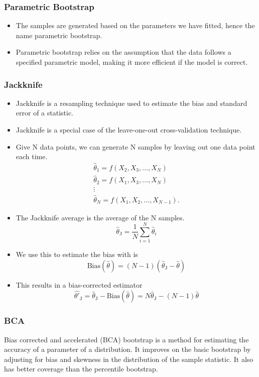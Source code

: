 \documentclass[12pt,a4paper]{article}
\begin{document}
\subsubsection{Parametric Bootstrap}
\begin{itemize}
    \item The samples are generated based on the parameters we have fitted, hence the name parametric bootstrap.
    \item Parametric bootstrap relies on the assumption that the data follows a specified parametric model, making it more efficient if the model is correct.
\end{itemize}
\subsubsection{Jackknife}
\begin{itemize}
    \item Jackknife is a resampling technique used to estimate the bias and standard error of a statistic.
    \item Jackknife is a special case of the leave-one-out cross-validation technique.
    \item Give N data points, we can generate N samples by leaving out one data point each time.
        \begin{equation*}
        \begin{array}{r}
        \hat{\theta}_1=f\left(X_2, X_3, \ldots, X_N\right) \\
        \hat{\theta}_2=f\left(X_1, X_3, \ldots, X_N\right) \\
        \vdots \\
        \hat{\theta}_N=f\left(X_1, X_2, \ldots, X_{N-1}\right) .
        \end{array}
        \end{equation*}
    \item The Jackknife average is the average of the N samples.
    $$
    \hat{\theta}_{\mathrm{J}}=\frac{1}{N} \sum_{i=1}^{N} \hat{\theta}_{i}
    $$
    \item We use this to estimate the bias with is 
    $$
    \mathrm{Bias}(\hat{\theta})=(N-1)\left(\hat{\theta}_{\mathrm{J}}-\hat{\theta}\right)
    $$
    \item This results in a bias-corrected estimator
    $$
    \hat{\theta'}_{\mathrm{J}}=\hat{\theta}_{\mathrm{J}}-\mathrm{Bias}(\hat{\theta}) = {N \hat{\theta}_{\mathrm{J}}}- (N-1)\hat{\theta}
    $$  
\end{itemize}
\subsubsection{BCA}
Bias corrected and accelerated (BCA) bootstrap is a method for estimating the accuracy of a parameter of a distribution. It improves on the basic bootstrap by adjusting for bias and skewness in the distribution of the sample statistic. It also has better coverage than the percentile bootstrap.
\end{document}
